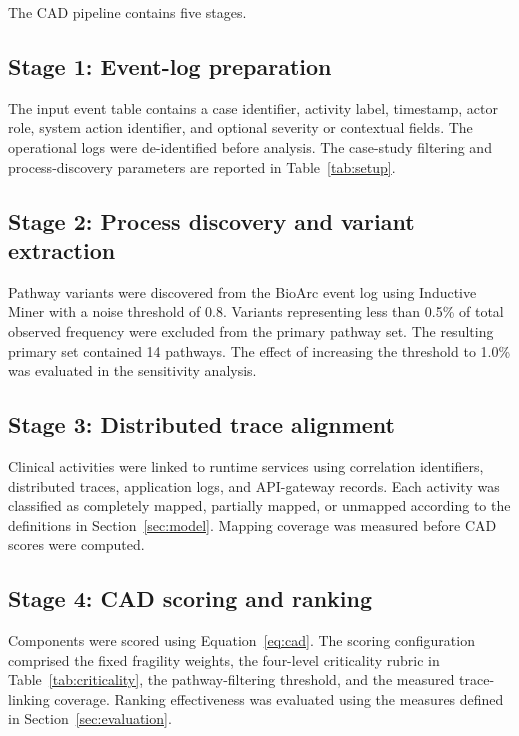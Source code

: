 \documentclass[english,preprint]{elsarticle}
\newcommand{\CAD}{\textsc{CAD}\xspace}
\begin{document}
The \CAD pipeline contains five stages.

\subsection{Stage 1: Event-log preparation}

The input event table contains a case identifier, activity label, timestamp, actor role, system action identifier, and optional severity or contextual fields. The operational logs were de-identified before analysis. The case-study filtering and process-discovery parameters are reported in Table~\ref{tab:setup}.

\subsection{Stage 2: Process discovery and variant extraction}

Pathway variants were discovered from the BioArc event log using Inductive Miner with a noise threshold of 0.8. Variants representing less than 0.5\% of total observed frequency were excluded from the primary pathway set. The resulting primary set contained 14 pathways. The effect of increasing the threshold to 1.0\% was evaluated in the sensitivity analysis.

\subsection{Stage 3: Distributed trace alignment}

Clinical activities were linked to runtime services using correlation identifiers, distributed traces, application logs, and API-gateway records. Each activity was classified as completely mapped, partially mapped, or unmapped according to the definitions in Section~\ref{sec:model}. Mapping coverage was measured before \CAD scores were computed.

\subsection{Stage 4: CAD scoring and ranking}

Components were scored using Equation~\eqref{eq:cad}. The scoring configuration comprised the fixed fragility weights, the four-level criticality rubric in Table~\ref{tab:criticality}, the pathway-filtering threshold, and the measured trace-linking coverage. Ranking effectiveness was evaluated using the measures defined in Section~\ref{sec:evaluation}.
\end{document}
